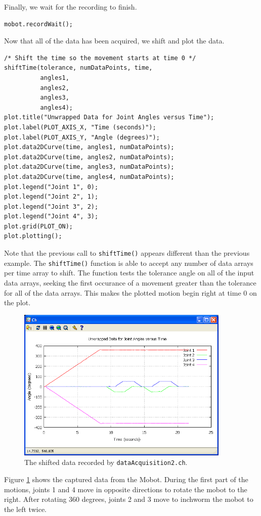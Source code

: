 \documentclass{article}
\begin{document}
Finally, we wait for the recording to finish.
\begin{verbatim}
mobot.recordWait();
\end{verbatim}

Now that all of the data has been acquired, we shift and plot the data.
\begin{verbatim}
/* Shift the time so the movement starts at time 0 */
shiftTime(tolerance, numDataPoints, time, 
          angles1, 
          angles2, 
          angles3, 
          angles4);
plot.title("Unwrapped Data for Joint Angles versus Time");
plot.label(PLOT_AXIS_X, "Time (seconds)");
plot.label(PLOT_AXIS_Y, "Angle (degrees)");
plot.data2DCurve(time, angles1, numDataPoints);
plot.data2DCurve(time, angles2, numDataPoints);
plot.data2DCurve(time, angles3, numDataPoints);
plot.data2DCurve(time, angles4, numDataPoints);
plot.legend("Joint 1", 0);
plot.legend("Joint 2", 1);
plot.legend("Joint 3", 2);
plot.legend("Joint 4", 3);
plot.grid(PLOT_ON);
plot.plotting();
\end{verbatim}
Note that the previous call to \texttt{shiftTime()} appears different than the previous
example. The \texttt{shiftTime()} function is able to accept any number of data
arrays per time array to shift. The function tests the tolerance angle on all of the
input data arrays, seeking the first occurance of a movement greater than the tolerance
for all of the data arrays. This makes the plotted motion begin right at time 0 on
the plot.

\begin{figure}[H]
\centering
\includegraphics[width=4in]{images/dataacq2_plot1.png}
\caption{\label{fig:dataacq2_fig1} The shifted data recorded by \texttt{dataAcquisition2.ch}.}
\end{figure}

Figure \ref{fig:dataacq2_fig1} shows the captured data from the Mobot. During the first
part of the motions, joints 1 and 4 move in opposite directions to rotate the mobot to
the right. After rotating 360 degrees, joints 2 and 3 move to inchworm the mobot to the
left twice.
\end{document}
